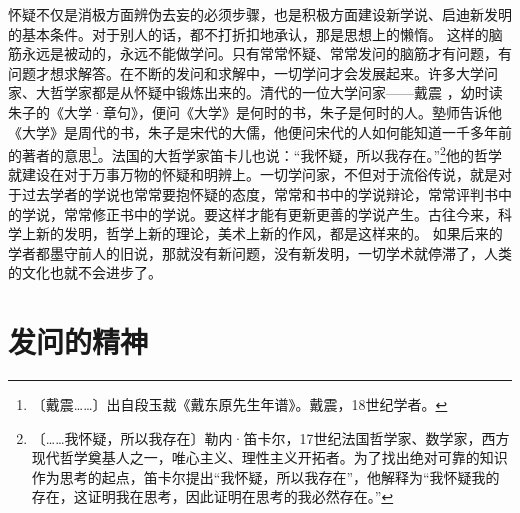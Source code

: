\documentclass[12pt,UTF-8,openany]{ctexbook}
\begin{document}
\begin{normalsize}
    怀疑不仅是消极方面辨伪去妄的必须步骤，也是积极方面建设新学说、启迪新发明的基本条件。对于别人的话，都不打折扣地承认，那是思想上的懒惰。 这样的脑筋永远是被动的，永远不能做学问。只有常常怀疑、常常发问的脑筋才有问题，有问题才想求解答。在不断的发问和求解中，一切学问才会发展起来。许多大学问家、大哲学家都是从怀疑中锻炼出来的。清代的一位大学问家——戴震 ，幼时读朱子的《大学·章句》，便问《大学》是何时的书，朱子是何时的人。塾师告诉他《大学》是周代的书，朱子是宋代的大儒，他便问宋代的人如何能知道一千多年前的著者的意思\footnote{〔戴震……〕出自段玉裁《戴东原先生年谱》。戴震，18世纪学者。}。法国的大哲学家笛卡儿也说：“我怀疑，所以我存在。”\footnote{〔……我怀疑，所以我存在〕勒内·笛卡尔，17世纪法国哲学家、数学家，西方现代哲学奠基人之一，唯心主义、理性主义开拓者。为了找出绝对可靠的知识作为思考的起点，笛卡尔提出“我怀疑，所以我存在”，他解释为“我怀疑我的存在，这证明我在思考，因此证明在思考的我必然存在。”}他的哲学就建设在对于万事万物的怀疑和明辨上。一切学问家，不但对于流俗传说，就是对于过去学者的学说也常常要抱怀疑的态度，常常和书中的学说辩论，常常评判书中的学说，常常修正书中的学说。要这样才能有更新更善的学说产生。古往今来，科学上新的发明，哲学上新的理论，美术上新的作风，都是这样来的。 如果后来的学者都墨守前人的旧说，那就没有新问题，没有新发明，一切学术就停滞了，人类的文化也就不会进步了。
    
\end{normalsize}



\chapter{发问的精神}
\end{document}
